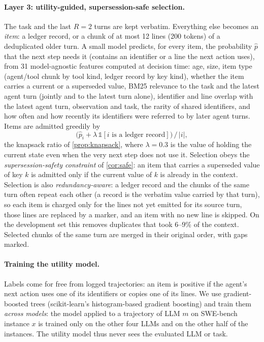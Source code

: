 \paragraph{Layer 3: utility-guided, supersession-safe selection.} The task and
the last $R{=}2$ turns are kept verbatim. Everything else becomes an
\emph{item}: a ledger record, or a chunk of at most 12 lines (200 tokens) of a
deduplicated older turn. A small model predicts, for every item, the
probability $\hat p$ that the next step needs it (contains an identifier or a
line the next action uses), from 31 model-agnostic features computed at
decision time: age, size, item type (agent/tool chunk by tool kind, ledger record
by key kind), whether the item carries a current or a superseded value, BM25
relevance to the task and the latest agent turn (jointly and to the latest turn
alone), identifier and line overlap with the latest agent turn, observation and
task, the rarity of shared identifiers, and how often and how recently its
identifiers were referred to by later agent turns. Items are admitted greedily by
\begin{equation}
  \bigl(\hat p_i + \lambda\,\mathbb{1}[i\text{ is a ledger record}]\bigr)\,/\,|i| ,
  \label{eq:ratio}
\end{equation}
the knapsack ratio of \cref{prop:knapsack}, where $\lambda{=}0.3$ is the value
of holding the current state even when the very next step does not use it.
Selection obeys the \emph{supersession-safety constraint} of \cref{cor:safe}:
an item that carries a superseded value of key $k$ is admitted only if the
current value of $k$ is already in the context. Selection is also
\emph{redundancy-aware}: a ledger record and the chunks of the same turn often
repeat each other (a record is the verbatim value carried by that turn), so each
item is charged only for the lines not yet emitted for its source turn, those
lines are replaced by a marker, and an item with no new line is skipped. On the
development set this removes duplicates that took 6--9\% of the context.
Selected chunks of the same turn are merged in their original order, with gaps
marked.

\paragraph{Training the utility model.} Labels come for free from logged
trajectories: an item is positive if the agent's next action uses one of its
identifiers or copies one of its lines. We use gradient-boosted trees
(scikit-learn's histogram-based gradient boosting) and train them
\emph{across models}: the model applied to a trajectory of LLM $m$ on SWE-bench
instance $x$ is trained only on the other four LLMs and on the other half of the
instances. The utility model thus never sees the evaluated LLM or task.

